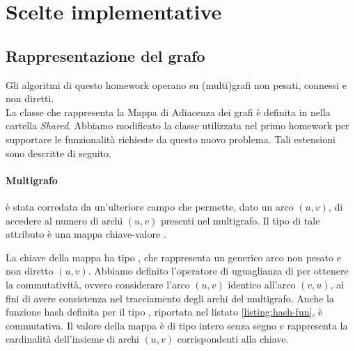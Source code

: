 \section{Scelte implementative}
\label{cap:implementation-choices}

\subsection{Rappresentazione del grafo}
\label{sub:graph-representation}

Gli algoritmi di questo homework operano su (multi)grafi non pesati,
connessi e non diretti.\\


\noindent La classe che rappresenta la Mappa di Adiacenza dei grafi è
definita in  nella cartella
\textit{Shared}. Abbiamo modificato la classe utilizzata nel primo homework per supportare le funzionalità richieste da questo nuovo problema. Tali estensioni sono descritte di seguito.

\paragraph{Multigrafo}
 è stata corredata da un'ulteriore
campo  che permette, dato un arco $(u,v)$, di
accedere al numero di archi $(u,v)$ presenti nel multigrafo. Il tipo di tale attributo è una mappa chiave-valore .

\noindent La chiave della mappa ha tipo , che rappresenta un generico arco non pesato e non diretto $(u,v)$. Abbiamo definito l'operatore di uguaglianza di  per ottenere la commutatività, ovvero considerare l'arco $(u, v)$ identico all'arco $(v, u)$, ai fini di avere consistenza nel tracciamento degli archi del multigrafo. Anche la funzione hash definita per il tipo , riportata nel listato  \ref{listing:hash-fun}, è commutativa.
\noindent Il valore della mappa è di tipo intero senza segno  e rappresenta la cardinalità dell'insieme di archi $(u,v)$ corrispondenti alla chiave. \\

